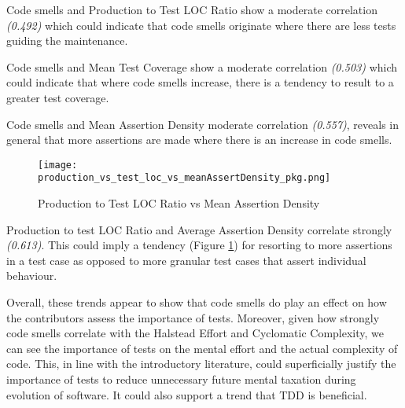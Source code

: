Code smells and Production to Test LOC Ratio show a moderate correlation \textit{(0.492)} which could indicate that code smells originate where there are less tests guiding the maintenance.

Code smells and Mean Test Coverage show a moderate correlation \textit{(0.503)} which could indicate that where code smells increase, there is a tendency to result to a greater test coverage. 

Code smells and Mean Assertion Density moderate correlation \textit{(0.557)}, reveals in general that more assertions are made where there is an increase in code smells. 

\begin{figure}[H]
	\texttt{[image: production\_vs\_test\_loc\_vs\_meanAssertDensity\_pkg.png]}
	\caption{Production to Test LOC Ratio vs Mean Assertion Density}
	\label{fig:prodtestRatioVsMeanAssertDensity}  
\end{figure}

Production to test LOC Ratio and Average Assertion Density correlate strongly \textit{(0.613)}. This could imply a tendency (Figure \ref{fig:prodtestRatioVsMeanAssertDensity}) for resorting to more assertions in a test case as opposed to more granular test cases that assert individual behaviour.

Overall, these trends appear to show that code smells do play an effect on how the contributors assess the importance of tests. Moreover, given how strongly code smells correlate with the Halstead Effort and Cyclomatic Complexity, we can see the importance of tests on the mental effort and the actual complexity of code. This, in line with the introductory literature, could superficially justify the importance of tests to reduce unnecessary future mental taxation during evolution of software. It could also support a trend that TDD is beneficial.